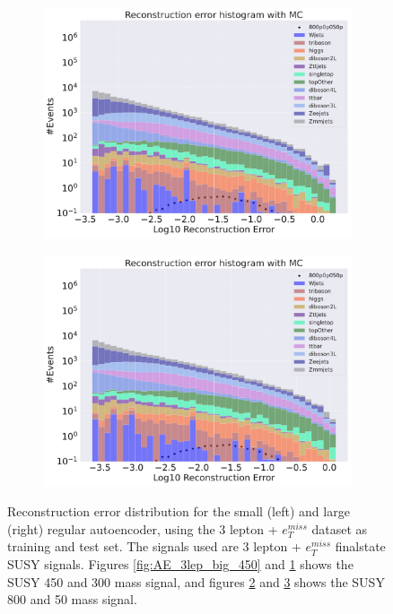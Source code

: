 \begin{figure}[H]
\begin{subfigure}{.45\textwidth}
        \caption{}
        \label{fig:AE_3lep_small_450}
    \end{subfigure}
    \hfill
    \begin{subfigure}{.45\textwidth}
        \includegraphics[width=\textwidth]{Figures/AE_testing/big/3lep/b_data_recon_big_rm3_feats_sig_800p0p050p.pdf}
        \caption{}
        \label{fig:AE_3lep_big_800}
    \end{subfigure}
    \hfill   
    \begin{subfigure}{.45\textwidth}
        \includegraphics[width=\textwidth]{Figures/AE_testing/small/3lep/b_data_recon_big_rm3_feats_sig_800p0p050p.pdf}
        \caption{}
        \label{fig:AE_3lep_small_800}
    \end{subfigure}
    \hfill      
    \caption[3lep reconstruction error with SUSY signals for AE]{Reconstruction error distribution for the small (left) and large (right)
    regular autoencoder, using the 3 lepton + $e_T^{miss}$ dataset as training and test set. The signals used are 3 lepton + $e_T^{miss}$ 
    finalstate SUSY signals. Figures \ref{fig:AE_3lep_big_450} and \ref{fig:AE_3lep_small_450} shows the SUSY 450 and 300 mass signal, 
    and figures \ref{fig:AE_3lep_big_800} and \ref{fig:AE_3lep_small_800} shows the SUSY 800 and 50 mass signal.}
    \label{fig:AE_3lep_recon_err_both_sig}
\end{figure}



